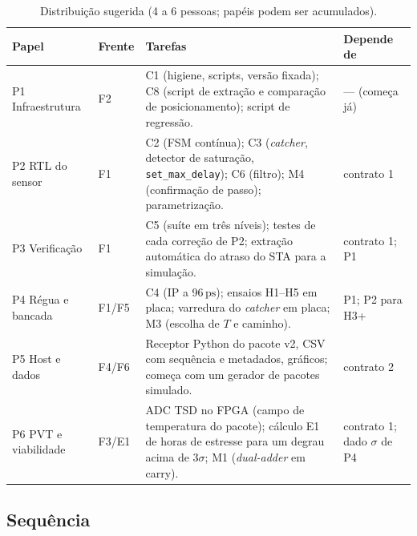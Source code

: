 \documentclass[11pt,a4paper]{article}
\newcommand{\ps}{\ensuremath{\,\mathrm{ps}}\xspace}
\begin{document}
\begin{table}[H]
\centering
\caption{Distribuição sugerida (4 a 6 pessoas; papéis podem ser acumulados).}
\label{tab:papeis}
\small
\begin{tabularx}{\textwidth}{@{}L{2.6cm} L{1.2cm} Y L{2.8cm}@{}}
\toprule
\textbf{Papel} & \textbf{Frente} & \textbf{Tarefas} & \textbf{Depende de} \\
\midrule
P1 Infraestrutura & F2 & C1 (higiene, scripts, versão fixada); C8 (script de extração e
comparação de posicionamento); script de regressão. & --- (começa já) \\
P2 RTL do sensor & F1 & C2 (FSM contínua); C3 (\emph{catcher}, detector de saturação,
\texttt{set\_max\_delay}); C6 (filtro); M4 (confirmação de passo); parametrização. & contrato 1 \\
P3 Verificação & F1 & C5 (suíte em três níveis); testes de cada correção de P2;
extração automática do atraso do STA para a simulação. & contrato 1; P1 \\
P4 Régua e bancada & F1/F5 & C4 (IP a 96\ps); ensaios H1--H5 em placa; varredura do
\emph{catcher} em placa; M3 (escolha de $T$ e caminho). & P1; P2 para H3+ \\
P5 Host e dados & F4/F6 & Receptor Python do pacote v2, CSV com sequência e metadados,
gráficos; começa com um gerador de pacotes simulado. & contrato 2 \\
P6 PVT e viabilidade & F3/E1 & ADC TSD no FPGA (campo de temperatura do pacote); cálculo E1
de horas de estresse para um degrau acima de $3\sigma$; M1 (\emph{dual-adder} em carry). & contrato 1; dado $\sigma$ de P4 \\
\bottomrule
\end{tabularx}
\end{table}

\subsection{Sequência}
\end{document}
